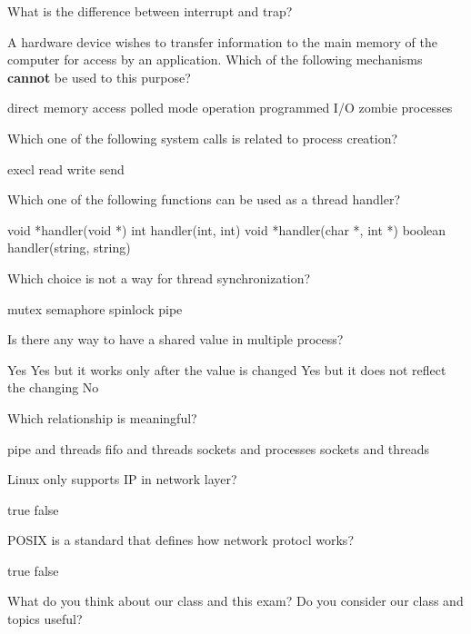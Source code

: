 \documentclass[12pt]{exam}
\begin{document}
\begin{questions}

\question[2] What is the difference between interrupt and trap?
\makeemptybox{\fill}
\addpoints

\newpage

\question[1] A hardware device wishes to transfer information to the main memory of the
computer for access by an application. Which of the following mechanisms \textbf{cannot} be used
to this purpose?
\begin{choices}
        \choice direct memory access
        \choice polled mode operation
        \choice programmed I/O
        \choice zombie processes
\end{choices}

\question[1] Which one of the following system calls is related to process creation?
\begin{choices}
        \choice execl
        \choice read
        \choice write
        \choice send
\end{choices}

\question[1] Which one of the following functions can be used as a thread handler?
\begin{choices}
        \choice void *handler(void *)
        \choice int handler(int, int)
        \choice void *handler(char *, int *)
        \choice boolean handler(string, string)
\end{choices}

\question[1] Which choice is not a way for thread synchronization?
\begin{choices}
        \choice mutex
        \choice semaphore
        \choice spinlock
        \choice pipe
\end{choices}

\question[1] Is there any way to have a shared value in multiple process?
\begin{choices}
        \choice Yes
        \choice Yes but it works only after the value is changed
        \choice Yes but it does not reflect the changing
        \choice No
\end{choices}

\question[1] Which relationship is meaningful?
\begin{choices}
        \choice pipe and threads
        \choice fifo and threads
        \choice sockets and processes
        \choice sockets and threads
\end{choices}

\question[1] Linux only supports IP in network layer?
\begin{choices}
        \choice true
        \choice false
\end{choices}

\question[1] POSIX is a standard that defines how network protocl works?
\begin{choices}
        \choice true
        \choice false
\end{choices}

\question[0]
What do you think about our class and this exam? Do you consider our class and topics
useful?
\makeemptybox{2in}

\end{questions}
\end{document}
